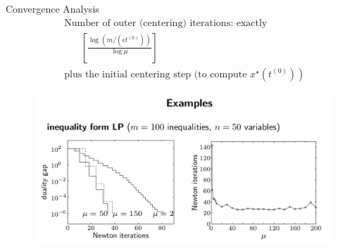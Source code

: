 \documentclass{beamer}
\begin{document}
\begin{frame}[noframenumbering]{Convergence Analysis}
\begin{equation*}
\begin{array}{l}{\text { Number of outer (centering) iterations: exactly }} \\ {\qquad\left[\frac{\log \left(m /\left(\epsilon t^{(0)}\right)\right)}{\log \mu}\right]} \\ { \text { plus the initial centering step (to compute }\left.x^{\star}\left(t^{(0)}\right)\right)}\end{array}
\end{equation*}
\begin{figure}
	\centering
	\includegraphics[width=0.7\linewidth]{Images/example}
	\label{fig:example}
\end{figure}
\end{frame}
\end{document}
